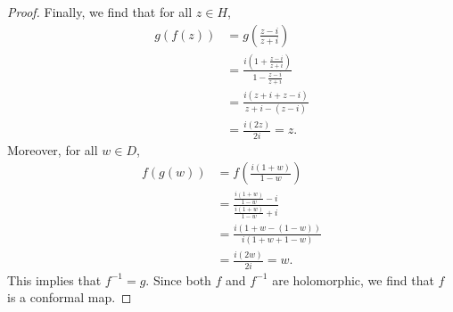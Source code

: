 \documentclass[a4paper, openany]{memoir}
\theoremstyle{definition}
\theoremstyle{plain}
\begin{document}
\begin{proof}
    Finally, we find that for all $z \in H$,
    \begin{align*}
        g(f(z)) &= g \left(\frac{z - i}{z + i}\right) \\
        &= \frac{i \left(1 + \frac{z - i}{z + i}\right)}{1 - \frac{z - i}{z + i}} \\
        &= \frac{i(z + i + z - i)}{z + i - (z - i)} \\
        &= \frac{i(2z)}{2i} = z.
    \end{align*}
    Moreover, for all $w \in D$,
    \begin{align*}
        f(g(w)) &= f \left(\frac{i(1 + w)}{1 - w}\right) \\
        &= \frac{\frac{i(1 + w)}{1 - w} - i}{\frac{i(1 + w)}{1 - w} + i} \\
        &= \frac{i(1 + w - (1 - w))}{i(1 + w + 1 - w)} \\
        &= \frac{i(2w)}{2i} = w.
    \end{align*}
    This implies that $f^{-1} = g$. Since both $f$ and $f^{-1}$ are holomorphic, we find that $f$ is a conformal map.
\end{proof}
\end{document}
